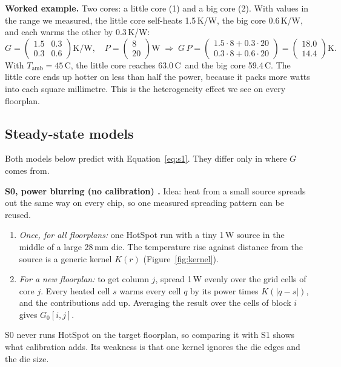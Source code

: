\documentclass[11pt,a4paper]{article}
\newcommand{\degC}{\,\textdegree C}
\begin{document}
\textbf{Worked example.} Two cores: a little core (1) and a big core (2). With values in the range
we measured, the little core self-heats 1.5\,K/W, the big core 0.6\,K/W, and each warms the other
by 0.3\,K/W:
\[
G = \begin{pmatrix} 1.5 & 0.3 \\ 0.3 & 0.6 \end{pmatrix}\text{K/W},\quad
P = \begin{pmatrix} 8 \\ 20 \end{pmatrix}\text{W}
\;\Rightarrow\;
G\,P = \begin{pmatrix} 1.5\cdot 8 + 0.3\cdot 20 \\ 0.3\cdot 8 + 0.6\cdot 20 \end{pmatrix}
     = \begin{pmatrix} 18.0 \\ 14.4 \end{pmatrix}\text{K}.
\]
With $T_\text{amb} = 45$\degC, the little core reaches 63.0\degC\ and the big core 59.4\degC. The
little core ends up hotter on less than half the power, because it packs more watts into each
square millimetre. This is the heterogeneity effect we see on every floorplan.

\subsection{Steady-state models}\label{sec:models}
Both models below predict with Equation~\eqref{eq:s1}. They differ only in where $G$ comes from.

\textbf{S0, power blurring (no calibration) \cite{blurring}.} Idea: heat from a small source
spreads out the same way on every chip, so one measured spreading pattern can be reused.
\begin{enumerate}
  \item \emph{Once, for all floorplans:} one HotSpot run with a tiny 1\,W source in the middle of
        a large 28\,mm die. The temperature rise against distance from the source is a generic
        kernel $K(r)$ (Figure~\ref{fig:kernel}).
  \item \emph{For a new floorplan:} to get column $j$, spread 1\,W evenly over the grid cells of
        core $j$. Every heated cell $s$ warms every cell $q$ by its power times $K(|q-s|)$, and
        the contributions add up. Averaging the result over the cells of block $i$ gives
        $G_0[i,j]$.
\end{enumerate}
S0 never runs HotSpot on the target floorplan, so comparing it with S1 shows what calibration
adds. Its weakness is that one kernel ignores the die edges and the die size.
\end{document}
